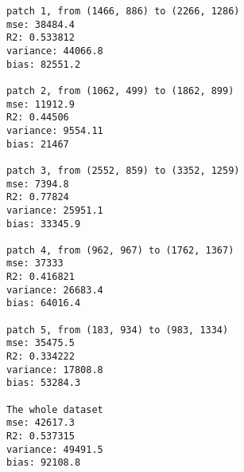 \documentclass[11pt]{article}
\begin{document}
    \begin{Verbatim}[commandchars=\\\{\}]
patch 1, from (1466, 886) to (2266, 1286)
mse: 38484.4
R2: 0.533812
variance: 44066.8
bias: 82551.2

patch 2, from (1062, 499) to (1862, 899)
mse: 11912.9
R2: 0.44506
variance: 9554.11
bias: 21467

patch 3, from (2552, 859) to (3352, 1259)
mse: 7394.8
R2: 0.77824
variance: 25951.1
bias: 33345.9

patch 4, from (962, 967) to (1762, 1367)
mse: 37333
R2: 0.416821
variance: 26683.4
bias: 64016.4

patch 5, from (183, 934) to (983, 1334)
mse: 35475.5
R2: 0.334222
variance: 17808.8
bias: 53284.3

The whole dataset
mse: 42617.3
R2: 0.537315
variance: 49491.5
bias: 92108.8


    \end{Verbatim}

    \begin{center}
    \end{center}
    { \hspace*{\fill} \\}
    
    \begin{center}
    \end{center}
    { \hspace*{\fill} \\}
    
    \begin{center}
    \end{center}
    { \hspace*{\fill} \\}
    
    \begin{center}
    \end{center}
    { \hspace*{\fill} \\}
    
    \begin{center}
    \end{center}
    { \hspace*{\fill} \\}
    

    
    
    
    
\end{document}
